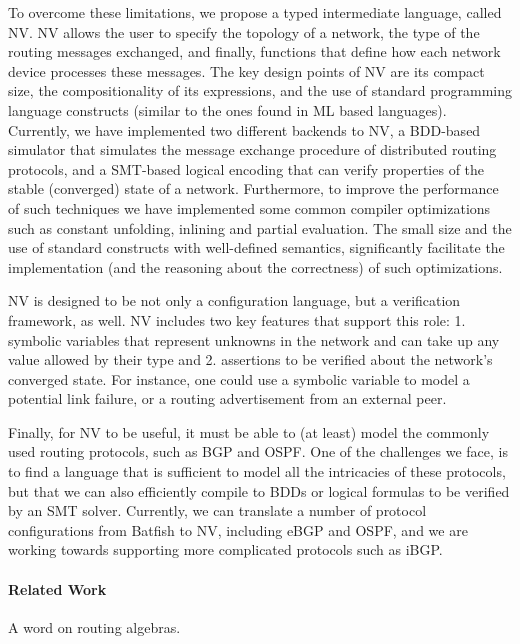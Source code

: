 \documentclass[sigconf,10pt]{acmart}
\begin{document}
To overcome these limitations, we propose a typed intermediate
language, called NV. NV allows the user to specify the topology of a
network, the type of the routing messages exchanged, and finally,
functions that define how each network device processes these
messages. The key design points of NV are its compact size, the
compositionality of its expressions, and the use of standard
programming language constructs (similar to the ones found in ML based
languages). Currently, we have implemented two different backends to
NV, a BDD-based simulator that simulates the message exchange
procedure of distributed routing protocols, and a SMT-based logical
encoding that can verify properties of the stable (converged) state of
a network. Furthermore, to improve the performance of such techniques
we have implemented some common compiler optimizations such as
constant unfolding, inlining and partial evaluation. The small size
and the use of standard constructs with well-defined semantics,
significantly facilitate the implementation (and the reasoning about
the correctness) of such optimizations.

NV is designed to be not only a configuration language, but a
verification framework, as well. NV includes two key features that
support this role: 1. symbolic variables that represent unknowns in
the network and can take up any value allowed by their type and
2. assertions to be verified about the network's converged state.  For
instance, one could use a symbolic variable to model a potential link
failure, or a routing advertisement from an external peer. 

Finally, for NV to be useful, it must be able to (at least) model the
commonly used routing protocols, such as BGP and OSPF. One of the
challenges we face, is to find a language that is sufficient to model
all the intricacies of these protocols, but that we can also
efficiently compile to BDDs or logical formulas to be verified by an
SMT solver. Currently, we can translate a number of protocol
configurations from Batfish to NV, including eBGP and OSPF, and we are
working towards supporting more complicated protocols such as iBGP.


\paragraph{Related Work} A word on routing algebras. 


 


\end{document}

